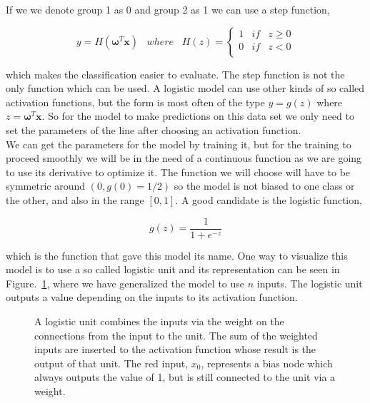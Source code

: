 If we we denote group 1 as 0 and group 2 as 1 we can use a step function,

\begin{equation}
    y = H(\bm{\omega}^T\bm{x}) \;\;\; where \;\;\; H(z) =
    \left\{
        \begin{array}{ccc}
            1 & if & z \geq 0 \\
            0 & if & z < 0 \\
        \end{array}
    \right.
\end{equation}

which makes the classification easier to evaluate. The step function is not the only function which can be used. A logistic model can use other kinds of so called activation functions, but the form is most often of the type $y=g(z)$ where $z= \bm{\omega}^T\bm{x}$. So for the model to make predictions on this data set we only need to set the parameters of the line after choosing an activation function.\\

We can get the parameters for the model by training it, but for the training to proceed smoothly we will be in the need of a continuous function as we are going to use its derivative to optimize it. The function we will choose will have to be symmetric around $(0,g(0)=1/2)$ so the model is not biased to one class or the other, and also in the range $[0,1]$. A good candidate is the logistic function,

\begin{equation}
    g(z) = \frac{1}{1+e^{-z}}
\end{equation}

which is the function that gave this model its name. One way to visualize this model is to use a so called logistic unit and its representation can be seen in Figure.~\ref{fig:logistic_unit}, where we have generalized the model to use $n$ inputs. The logistic unit outputs a value depending on the inputs to its activation function.

\begin{figure}[h]
    \centering
    
    \caption{\label{fig:logistic_unit}A logistic unit combines the inputs via the weight on the connections from the input to the unit. The sum of the weighted inputs are inserted to the activation function whose result is the output of that unit. The red input, $x_0$, represents a bias node which always outputs the value of 1, but is still connected to the unit via a weight.}
\end{figure}

